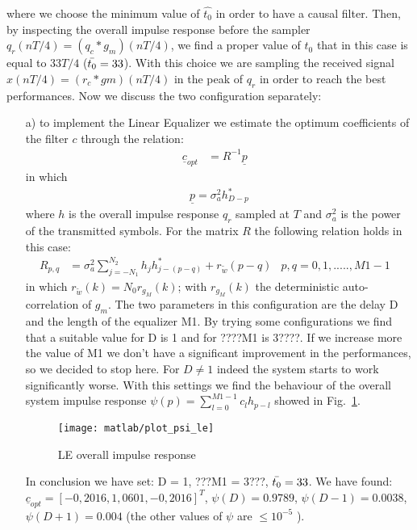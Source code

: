 \documentclass[a4paper,oneside]{article}
\renewcommand{\vec}[1]{\underline{#1}}
\begin{document}
{\color{red}where we choose the minimum value of $\hat{t_0}$} in order to have a causal filter. 
Then, by inspecting the overall impulse response before the sampler $q_r(n T/4) = (q_c * g_m)(n T/4)$, we find a proper value of $t_0$ that in this case is equal to $33T/4$ ($\Bar{t_0} = 33$). With this choice we are sampling the received signal $x(nT/4) = (r_c*gm)(nT/4)$ in the peak of $q_r$ {\color{red} in order to reach the best performances}.
Now we discuss the two configuration separately:
\begin{itemize}
\item[a)] to implement the Linear Equalizer we estimate the optimum coefficients of the filter $c$ through the relation:
\begin{align}
\vec{c}_{opt}& = R^{-1} \vec{p}& 
\end{align} 
in which 
\begin{align}
&\vec{p} = \sigma_a^2 h_{D-p}^*&	
\end{align}
where $h$ is the overall impulse response $q_r$ sampled at $T$ and $\sigma_a^2$ is the power of the transmitted symbols. For the matrix $R$ the following relation holds in this case:
\begin{align}
 R_{p,q} &= \sigma^2_a \sum_{j=-N_1}^{N_2}h_jh^*_{j-(p-q)} + r_{\tilde{w}}(p-q) & p,q = 0,1,.....,M1-1&
\end{align}
in which $r_{\tilde{w}}(k) = N_0 r_{g_M}(k)$; with $r_{g_M}(k)$ the deterministic auto-correlation of $g_m$.
The two parameters in this configuration are the delay D and the length of the  equalizer M1. By trying some configurations we find that a suitable value for D is 1 and for ????M1 is 3????. If we increase more the value of M1 we don't have a significant improvement in the performances, so we decided to stop here. {\color{red} For $D\neq 1$ indeed the system starts to work significantly worse}. With this settings we find the behaviour of the overall system impulse response $\psi(p) = \sum_{l=0}^{M1-1} c_l h_{p-l}$ showed in Fig.~\ref{plot:psi_le}. 

\begin{figure}[h]
  \centering
  \texttt{[image: matlab/plot\_psi\_le]}
  \caption{LE overall impulse response}
  \label{plot:psi_le}
\end{figure}

\newpage In conclusion we have set: D = 1, ???M1 = 3???, $\Bar{t_0} = 33$. 
\newline We have found: $\vec{c}_{opt} = [-0,2016, 1,0601, -0,2016]^T$,{\color{red} $\psi(D) = 0.9789$, $\psi(D-1) = 0.0038$, $\psi(D+1) = 0.004$ (the other values of $\psi$ are $\leq 10^{-5}$ ).}


\end{itemize}
\end{document}
